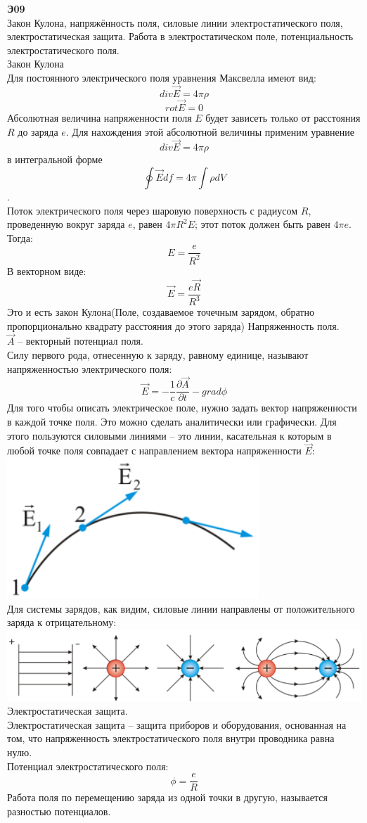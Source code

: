 \documentclass[__main__.tex]{subfiles}
\begin{document}
\textbf{Э09}\\

Закон Кулона, напряжённость поля, силовые линии электростатического поля, электростатическая защита. Работа в электростатическом поле, потенциальность электростатического поля.\\

Закон Кулона\\
Для постоянного электрического поля уравнения Максвелла имеют вид:
$$ div \vec{E} = 4 \pi \rho$$
$$ rot \vec{E} = 0$$
Абсолютная величина напряженности поля $E$ будет зависеть только от расстояния $R$ до заряда $e$. Для нахождения этой абсолютной величины применим уравнение $$ div \vec{E} = 4 \pi \rho$$ в интегральной форме $$\oint \vec{E} df = 4 \pi \int \rho dV$$.\\
Поток электрического поля через шаровую поверхность с радиусом $R$, проведенную вокруг заряда $e$, равен $4\pi R^2 E$; этот поток должен быть равен $4\pi e$. Тогда:\\
$$E = \frac{e}{R^2}$$
В векторном виде:
$$\vec{E} = \frac{e \vec{R}}{R^3}$$
Это и есть закон Кулона(Поле, создаваемое точечным зарядом, обратно пропорционально квадрату расстояния до этого заряда)
Напряженность поля.\\
$\vec{A}$ -- векторный потенциал поля.\\
Силу первого рода, отнесенную к заряду, равному единице, называют напряженностью электрического поля:\\
$$\vec{E} = -\frac{1}{c}\frac{\partial \vec{A}}{\partial t}-grad \phi$$
Для того чтобы описать электрическое поле, нужно задать вектор напряженности в каждой точке поля. Это можно сделать аналитически или графически. Для этого пользуются силовыми линиями – это линии, касательная к которым в любой точке поля совпадает с направлением вектора напряженности $\vec{E}$:\\
\includegraphics[width=.5\linewidth]{img/e-09-1}\\
Для системы зарядов, как видим, силовые линии направлены от положительного заряда к отрицательному:\\
\includegraphics[width=.9\linewidth]{img/e-09-2}\\
Электростатическая защита.\\
Электростатическая защита – защита приборов и оборудования, основанная на том, что напряженность электростатического поля внутри проводника равна нулю.\\
Потенциал электростатического поля:
$$\phi = \frac{e}{R}$$
Работа поля по перемещению заряда из одной точки в другую, называется разностью потенциалов.\\
\end{document}
